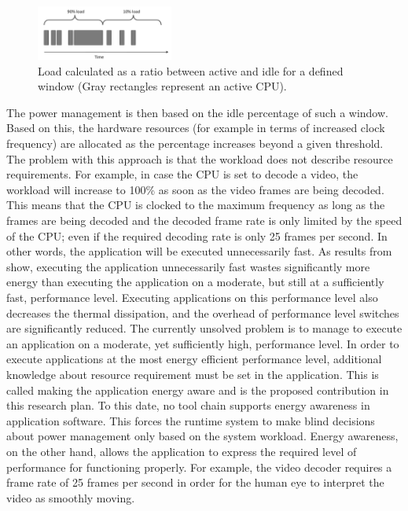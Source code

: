 \documentclass{article}
\begin{document}
\begin{figure}
  \begin{center}
    \includegraphics[width=0.4\textwidth]{fig/workload.png}
  \end{center}
  \caption{Load calculated as a ratio between active and idle for a defined window (Gray rectangles represent an active CPU).}
  \label{fig:workload}
\end{figure}

The power management is then based on the idle percentage of such a window. 
Based on this, the hardware resources (for example in terms of increased clock frequency) are allocated as the percentage increases beyond a given threshold. 
The problem with this approach is that the workload does not describe resource requirements. 
For example, in case the CPU is set to decode a video, the workload will increase to 100\% as soon as the video frames are being decoded.  
This means that the CPU is clocked to the maximum frequency as long as the frames are being decoded and the decoded frame rate is only limited by the speed of the CPU; 
even if the required decoding rate is only 25 frames per second. In other words, the application will be executed unnecessarily fast. 
As results from \cite{HolmbackaHipeac, HolmbackaDasip} show, executing the application unnecessarily fast wastes significantly more energy than executing the application on a moderate, 
but still at a sufficiently fast, performance level. 
Executing applications on this performance level also decreases the thermal dissipation, and the overhead of performance level switches are significantly reduced.
The currently unsolved problem is to manage to execute an application on a moderate, yet sufficiently high, performance level. 
In order to execute applications at the most energy efficient performance level, additional knowledge about resource requirement must be set in the application. 
This is called making the application energy aware and is the proposed contribution in this research plan. To this date, no tool chain supports energy awareness in application software. 
This forces the runtime system to make blind decisions about power management only based on the system workload. 
Energy awareness, on the other hand, allows the application to express the required level of performance for functioning properly. 
For example, the video decoder requires a frame rate of 25 frames per second in order for the human eye to interpret the video as smoothly moving. 
\end{document}
